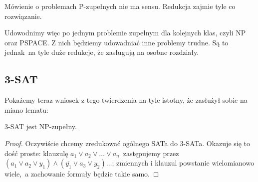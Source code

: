 \begin{corollary}
    Mówienie o problemach P-zupełnych nie ma sensu. Redukcja zajmie tyle co rozwiązanie.
\end{corollary}

Udowodnimy więc po jednym problemie zupełnym dla kolejnych klas, czyli NP oraz PSPACE. Z nich będziemy udowadniać inne problemy trudne. Są to jednak\
na tyle duże redukcje, że zasługują na osobne rozdziały.



\subsection{3-SAT}

Pokażemy teraz wniosek z tego twierdzenia na tyle istotny, że zasłużył sobie na miano lematu:

\begin{lemma}
    3-SAT jest NP-zupełny.
\end{lemma}

\begin{proof}
    Oczywiście chcemy zredukować ogólnego SATa do 3-SATa. Okazuje się to dość proste: klauzulę \(a_1 \vee a_2 \vee \dotsc \vee a_n \)\
    zastępujemy przez \((a_1 \vee a_2 \vee y_1) \wedge (\overline{y_1} \vee a_3 \vee y_2) \dotsc \); zmiennych i klauzul powstanie wielomianowo wiele,\
    a zachowanie formuły będzie takie samo.
\end{proof}

